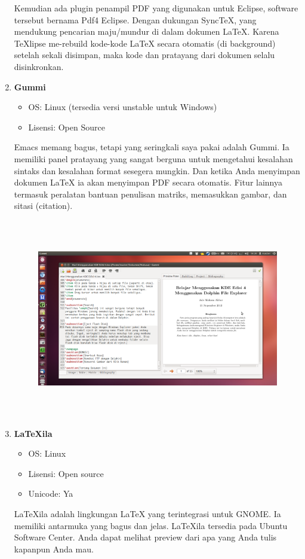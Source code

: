 \begin{enumerate}
Kemudian ada plugin penampil PDF yang digunakan untuk Eclipse, software tersebut bernama Pdf4 Eclipse. Dengan dukungan SyncTeX, yang mendukung pencarian maju/mundur di dalam dokumen LaTeX. Karena TeXlipse me-rebuild kode-kode LaTeX secara otomatis (di background) setelah sekali disimpan, maka kode dan pratayang dari dokumen selalu disinkronkan.

\item \textbf{Gummi}
\begin{itemize}
\item OS: Linux (tersedia versi unstable untuk Windows)
\item Lisensi: Open Source
\end{itemize}


Emacs memang bagus, tetapi yang seringkali saya pakai adalah Gummi. Ia memiliki panel pratayang yang sangat berguna untuk mengetahui kesalahan sintaks dan kesalahan format sesegera mungkin. Dan ketika Anda menyimpan dokumen LaTeX ia akan menyimpan PDF secara otomatis. Fitur lainnya termasuk peralatan bantuan penulisan matriks, memasukkan gambar, dan
sitasi (citation).
\par \vspace{12pt}

\begin{figure}[ht]

\includegraphics[width=15.45cm,height=8.68cm]{gambar/image10.jpg}
\end{figure}

\item \textbf{LaTeXila}
\begin{itemize}
\item OS: Linux
\item Lisensi: Open source
\item Unicode: Ya
\end{itemize}
\hspace{0,5in}LaTeXila adalah lingkungan LaTeX yang terintegrasi untuk GNOME. Ia memiliki antarmuka yang bagus dan jelas. LaTeXila tersedia pada Ubuntu Software Center. Anda dapat melihat preview dari apa yang Anda tulis kapanpun Anda mau.
\par \vspace{12pt}


\end{enumerate}
